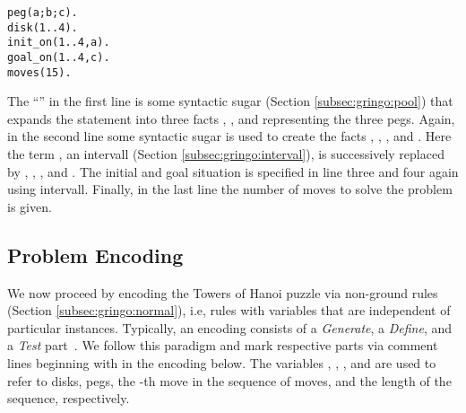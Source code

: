 \begin{lstlisting}
peg(a;b;c).
disk(1..4).
init_on(1..4,a).
goal_on(1..4,c).
moves(15).
\end{lstlisting}

The ``\code{;}'' in the first line is some syntactic sugar (Section \ref{subsec:gringo:pool})
that expands the statement into three facts
, , and  representing the three pegs.
Again, in the second line some syntactic sugar is used to 
create the facts , , , and .
Here the term , an intervall (Section \ref{subsec:gringo:interval}), is successively replaced by , , , and .
The initial and goal situation is specified in line three and four again using intervall.
Finally, in the last line the number of moves to solve the problem is given.

\subsection{Problem Encoding}

We now proceed by encoding the Towers of Hanoi puzzle via non-ground rules (Section \ref{subsec:gringo:normal}), 
i.e, rules with variables that are independent of particular instances.
Typically, an encoding consists of a \emph{Generate}, a \emph{Define},
and a \emph{Test} part~\cite{lifschitz02a}.
We follow this paradigm and
mark respective parts via comment lines beginning with \code{\%} in the encoding below.
The variables , , , and  are used
to refer to disks, pegs, the -th move in the sequence of moves, and the length of the sequence, respectively.

